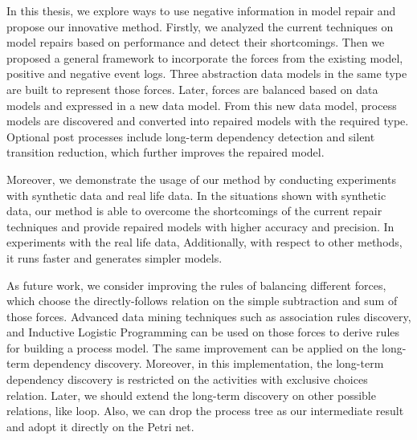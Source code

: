 
In this thesis, we explore ways to use negative information in model repair and propose our innovative method. Firstly, we analyzed the current techniques on model repairs based on performance and detect their shortcomings. Then we  proposed a general framework to incorporate the forces from the existing model, positive and negative event logs. Three abstraction data models in the same type are built to represent those forces. Later, forces are balanced based on data models and expressed in a new data model. From this new data model, process models are discovered and converted into repaired models with the required type. Optional post processes include long-term dependency detection and silent transition reduction, which further improves the repaired model. 

Moreover, we demonstrate the usage of our method by conducting experiments with synthetic data and real life data. In the situations shown with synthetic data,  our method is able to overcome the shortcomings of the current repair techniques and provide repaired models with higher accuracy and precision. In experiments with the real life data, 
Additionally, with respect to other methods, it runs faster and generates simpler models. 

As future work, we consider improving the rules of balancing different forces, which choose the directly-follows relation on the simple subtraction and sum of those forces. Advanced data mining techniques such as association rules discovery, and Inductive Logistic Programming can be used on those forces to derive rules for building a process model. The same improvement can be applied on the long-term dependency discovery. Moreover, in this implementation, the long-term dependency discovery is restricted on the activities with exclusive choices relation. Later, we should extend the long-term discovery on other possible relations, like loop. Also, we can drop the process tree as our intermediate result and adopt it directly on the Petri net. 


